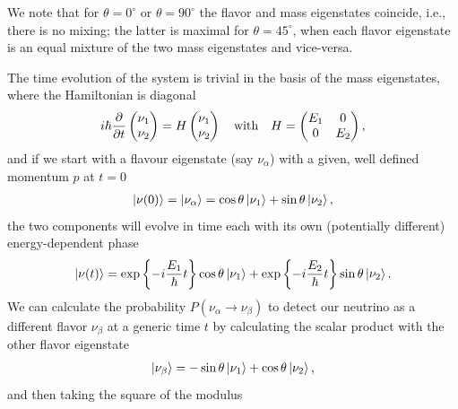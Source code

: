 We note that for $\theta = 0^\circ$ or $\theta = 90^\circ$ the flavor and mass
eigenstates coincide, i.e., there is no mixing; the latter
is maximal for $\theta = 45^\circ$, when each flavor eigenstate is an equal mixture
of the two mass eigenstates and vice-versa.

The time evolution of the system is trivial in the basis of the mass eigenstates,
where the Hamiltonian is diagonal
\begin{align}\label{eq:nu_schroedinger}
  i\hbar \pdv{t} \begin{pmatrix}\nu_1\\ \nu_2 \end{pmatrix} =
  H \begin{pmatrix}\nu_1\\ \nu_2 \end{pmatrix} \quad\text{with}\quad
  H =
  \begin{pmatrix}
  E_1 & 0\\
  0 & E_2\\
  \end{pmatrix},
\end{align}
and if we start with a flavour eigenstate (say $\nu_\alpha$) with a given, well defined
momentum $p$ at $t=0$
\begin{align*}
  \ket{\nu(0)} = \ket{\nu_\alpha} = \cos\theta \ket{\nu_1} + \sin\theta \ket{\nu_2},
\end{align*}
the two components will evolve in time each with its own (potentially different)
energy-dependent phase
\begin{align*}
  \ket{\nu(t)} =
    \exp\qty{-i\frac{E_1}{\hbar}t} \cos\theta \ket{\nu_1} +
    \exp\qty{-i\frac{E_2}{\hbar}t} \sin\theta \ket{\nu_2}.
\end{align*}
We can calculate the probability $P(\nu_\alpha \rightarrow \nu_\beta)$ to detect our
neutrino as a different flavor $\nu_\beta$ at a generic time $t$ by calculating the
scalar product with the other flavor eigenstate
\begin{align*}
  \ket{\nu_\beta} = -\sin\theta \ket{\nu_1} + \cos\theta \ket{\nu_2},
\end{align*}
and then taking the square of the modulus
